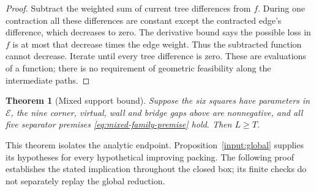 \documentclass[11pt]{article}
\newtheorem{theorem}{Theorem}[section]
\begin{document}
\begin{proof}
Subtract the weighted sum of current tree differences from $f$.
During one contraction all these differences are constant except
the contracted edge's difference, which decreases to zero. The
derivative bound says the possible loss in $f$ is at most that decrease
times the edge weight. Thus the subtracted function cannot decrease.
Iterate until every tree difference is zero. These are evaluations
of a function; there is no requirement of geometric feasibility along
the intermediate paths.
\end{proof}

\begin{theorem}[Mixed support bound]
\label{thm:mixed-support}
Suppose the six squares have parameters in $\mathcal E$, the nine
corner, virtual, wall and bridge gaps above are nonnegative, and all
five separator premises \eqref{eq:mixed-family-premise} hold.
Then $L\ge T$.
\end{theorem}

This theorem isolates the analytic endpoint. Proposition~\ref{input:global}
supplies its hypotheses for every hypothetical improving packing. The
following proof establishes the stated implication throughout the closed
box; its finite checks do not separately replay the global reduction.
\end{document}
